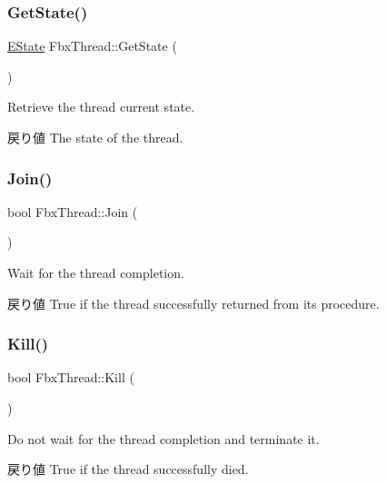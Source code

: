 \subsubsection{\texorpdfstring{Get\+State()}{GetState()}}
{\footnotesize\ttfamily \hyperlink{class_fbx_thread_a82f55f0fc5f947d4357c8175d05782ff}{E\+State} Fbx\+Thread\+::\+Get\+State (\begin{DoxyParamCaption}{ }\end{DoxyParamCaption})}

Retrieve the thread current state. \begin{DoxyReturn}{戻り値}
The state of the thread. 
\end{DoxyReturn}
\mbox{\label{class_fbx_thread_a784d4eb2cd3ca88f9f9283c1488467fa}} 
\subsubsection{\texorpdfstring{Join()}{Join()}}
{\footnotesize\ttfamily bool Fbx\+Thread\+::\+Join (\begin{DoxyParamCaption}{ }\end{DoxyParamCaption})}

Wait for the thread completion. \begin{DoxyReturn}{戻り値}
True if the thread successfully returned from its procedure. 
\end{DoxyReturn}
\mbox{\label{class_fbx_thread_a24115ea67bd15a8181051693aef22ba1}} 
\subsubsection{\texorpdfstring{Kill()}{Kill()}}
{\footnotesize\ttfamily bool Fbx\+Thread\+::\+Kill (\begin{DoxyParamCaption}{ }\end{DoxyParamCaption})}

Do not wait for the thread completion and terminate it. \begin{DoxyReturn}{戻り値}
True if the thread successfully died. 
\end{DoxyReturn}
\mbox{\label{class_fbx_thread_a829e856a545af8ca53ac10241f5388fc}} 
